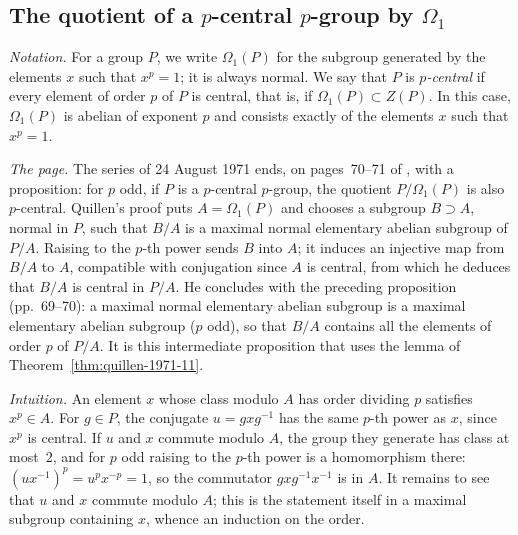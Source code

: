 
\subsection*{The quotient of a $p$-central $p$-group by $\Omega_1$\protect{}}\label{sec:quillen-1971-11-a}

\emph{Notation.} For a group $P$, we write $\Omega_1(P)$ for the subgroup generated by the elements $x$ such that $x^p = 1$; it is always normal. We say that $P$ is \emph{$p$-central} if every element of order $p$ of $P$ is central, that is, if $\Omega_1(P) \subset Z(P)$. In this case, $\Omega_1(P)$ is abelian of exponent $p$ and consists exactly of the elements $x$ such that $x^p = 1$.

\emph{The page.} The series of 24 August 1971 ends, on pages~70--71 of , with a proposition: for $p$ odd, if $P$ is a $p$-central $p$-group, the quotient $P/\Omega_1(P)$ is also $p$-central. Quillen's proof puts $A = \Omega_1(P)$ and chooses a subgroup $B \supset A$, normal in $P$, such that $B/A$ is a maximal normal elementary abelian subgroup of $P/A$. Raising to the $p$-th power sends $B$ into $A$; it induces an injective map from $B/A$ to $A$, compatible with conjugation since $A$ is central, from which he deduces that $B/A$ is central in $P/A$. He concludes with the preceding proposition (pp.~69--70): a maximal normal elementary abelian subgroup is a maximal elementary abelian subgroup ($p$ odd), so that $B/A$ contains all the elements of order $p$ of $P/A$. It is this intermediate proposition that uses the lemma of Theorem~\ref{thm:quillen-1971-11}.

\emph{Intuition.} An element $x$ whose class modulo $A$ has order dividing $p$ satisfies $x^p \in A$. For $g \in P$, the conjugate $u = gxg^{-1}$ has the same $p$-th power as $x$, since $x^p$ is central. If $u$ and $x$ commute modulo $A$, the group they generate has class at most~$2$, and for $p$ odd raising to the $p$-th power is a homomorphism there: $(ux^{-1})^p = u^p x^{-p} = 1$, so the commutator $gxg^{-1}x^{-1}$ is in $A$. It remains to see that $u$ and $x$ commute modulo $A$; this is the statement itself in a maximal subgroup containing $x$, whence an induction on the order.

